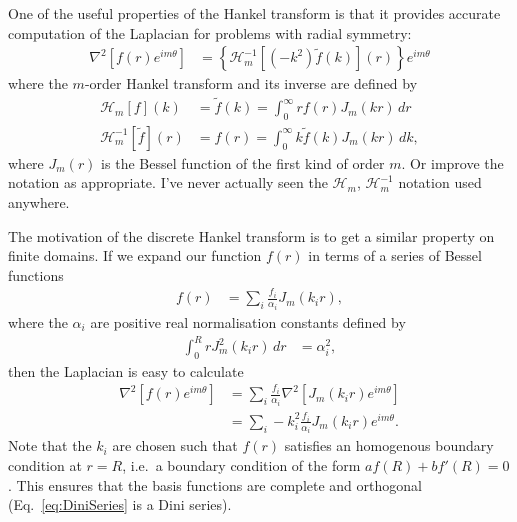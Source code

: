 \documentclass[aip,amsmath,amssymb,reprint,twocolumn]{revtex4-1}
\begin{document}
One of the useful properties of the Hankel transform is that it provides accurate computation of the Laplacian for problems with radial symmetry:
\begin{align}
  \nabla^2 \left[f(r) e^{i m \theta}\right] &= \left\{\mathcal{H}^{-1}_m\left[(-k^2)\tilde{f}(k)\right](r)\right\}e^{i m \theta}
\end{align}
where the $m$-order Hankel transform and its inverse are defined by
\begin{align}
  \mathcal{H}_m[f](k) &= \tilde{f}(k) = \int_0^{\infty} r f(r) J_m(k r) \, dr \label{eq:HankelTransform}\\
  \mathcal{H}^{-1}_m[\tilde{f}](r) &= f(r) = \int_0^{\infty} k \tilde{f}(k) J_m(k r)\, dk, \label{eq:InverseHankelTransform} 
\end{align}
where $J_m(r)$ is the Bessel function of the first kind of order $m$. Or improve the notation as appropriate.  I've never actually seen the $\mathcal{H}_m$, $\mathcal{H}^{-1}_m$ notation used anywhere.

The motivation of the discrete Hankel transform is to get a similar property on finite domains.  If we expand our function $f(r)$ in terms of a series of Bessel functions
\begin{align}
  f(r) &= \sum_i \frac{f_i}{\alpha_i} J_m(k_i r), \label{eq:DiniSeries}
\end{align}
where the $\alpha_i$ are positive real normalisation constants defined by
\begin{align}
  \int_0^R r J_m^2(k_i r)\, dr &= \alpha_i^2,
\end{align}
then the Laplacian is easy to calculate
\begin{align}
  \nabla^2\left[f(r) e^{i m \theta}\right] &= \sum_i \frac{f_i}{\alpha_i} \nabla^2\left[J_m(k_i r) e^{i m \theta}\right] \\
  &= \sum_i - k_i^2 \frac{f_i}{\alpha_i} J_m(k_i r) e^{i m \theta}.
\end{align}
Note that the $k_i$ are chosen such that $f(r)$ satisfies an homogenous boundary condition at $r=R$, i.e.\ a boundary condition of the form $a f(R) + b f'(R) = 0$.  This ensures that the basis functions are complete and orthogonal (Eq.~\eqref{eq:DiniSeries} is a Dini series\citep{Watson:1966}).
\end{document}
